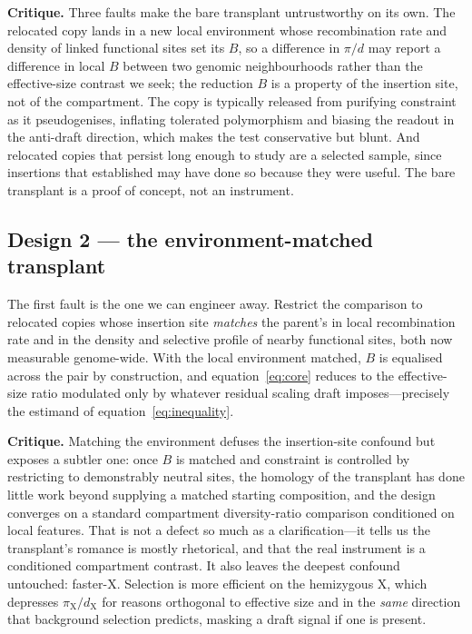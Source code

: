 \documentclass[11pt,a4paper]{article}
\begin{document}
\textbf{Critique.} Three faults make the bare transplant untrustworthy on its own. The relocated copy lands in a new local environment whose recombination rate and density of linked functional sites set its $B$, so a difference in $\pi/d$ may report a difference in local $B$ between two genomic neighbourhoods rather than the effective-size contrast we seek; the reduction $B$ is a property of the insertion site, not of the compartment. The copy is typically released from purifying constraint as it pseudogenises, inflating tolerated polymorphism and biasing the readout in the anti-draft direction, which makes the test conservative but blunt. And relocated copies that persist long enough to study are a selected sample, since insertions that established may have done so because they were useful. The bare transplant is a proof of concept, not an instrument.

\subsection{Design 2 --- the environment-matched transplant}

The first fault is the one we can engineer away. Restrict the comparison to relocated copies whose insertion site \emph{matches} the parent's in local recombination rate and in the density and selective profile of nearby functional sites, both now measurable genome-wide. With the local environment matched, $B$ is equalised across the pair by construction, and equation~\eqref{eq:core} reduces to the effective-size ratio modulated only by whatever residual scaling draft imposes---precisely the estimand of equation~\eqref{eq:inequality}.

\textbf{Critique.} Matching the environment defuses the insertion-site confound but exposes a subtler one: once $B$ is matched and constraint is controlled by restricting to demonstrably neutral sites, the homology of the transplant has done little work beyond supplying a matched starting composition, and the design converges on a standard compartment diversity-ratio comparison conditioned on local features. That is not a defect so much as a clarification---it tells us the transplant's romance is mostly rhetorical, and that the real instrument is a conditioned compartment contrast. It also leaves the deepest confound untouched: faster-X. Selection is more efficient on the hemizygous X, which depresses $\pi_{\mathrm X}/d_{\mathrm X}$ for reasons orthogonal to effective size and in the \emph{same} direction that background selection predicts, masking a draft signal if one is present.
\end{document}
